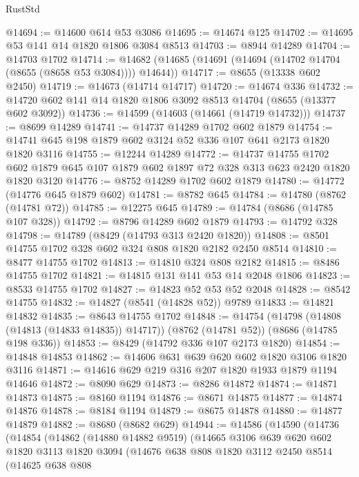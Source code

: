 \begin{lexlean}{RustStd}
\begin{coremodule}
@14694 := @14600 @614 @53 @3086
@14695 := @14674 @125
@14702 := @14695 @53 @141 @14 @1820 @1806 @3084 @8513
@14703 := @8944 @14289
@14704 := @14703 @1702
@14714 := @14682 (@14685 (@14691 (@14694 (@14702 @14704 (@8655 (@8658 @53 @3084)))) @14644))
@14717 := @8655 (@13338 @602 @2450)
@14719 := @14673 (@14714 @14717)
@14720 := @14674 @336
@14732 := @14720 @602 @141 @14 @1820 @1806 @3092 @8513 @14704 (@8655 (@13377 @602 @3092))
@14736 := @14599 (@14603 (@14661 (@14719 @14732)))
@14737 := @8699 @14289
@14741 := @14737 @14289 @1702 @602 @1879
@14754 := @14741 @645 @198 @1879 @602 @3124 @52 @336 @107 @641 @2173 @1820 @1820 @3116
@14755 := @12244 @14289
@14772 := @14737
    @14755
    @1702
    @602
    @1879
    @645
    @107
    @1879
    @602
    @1897
    @72
    @328
    @313
    @623
    @2420
    @1820
    @1820
    @3120
@14776 := @8752 @14289 @1702 @602 @1879
@14780 := @14772 (@14776 @645 @1879 @602)
@14781 := @8782 @645
@14784 := @14780 (@8762 (@14781 @72))
@14785 := @12275 @645
@14789 := @14784 (@8686 (@14785 @107 @328))
@14792 := @8796 @14289 @602 @1879
@14793 := @14792 @328
@14798 := @14789 (@8429 (@14793 @313 @2420 @1820))
@14808 := @8501 @14755 @1702 @328 @602 @324 @808 @1820 @2182 @2450 @8514
@14810 := @8477 @14755 @1702
@14813 := @14810 @324 @808 @2182
@14815 := @8486 @14755 @1702
@14821 := @14815 @131 @141 @53 @14 @2048 @1806
@14823 := @8533 @14755 @1702
@14827 := @14823 @52 @53 @52 @2048
@14828 := @8542 @14755
@14832 := @14827 (@8541 (@14828 @52)) @9789
@14833 := @14821 @14832
@14835 := @8643 @14755 @1702
@14848 := @14754
    (@14798 (@14808 (@14813 (@14833 @14835)) @14717))
    (@8762 (@14781 @52))
    (@8686 (@14785 @198 @336))
@14853 := @8429 (@14792 @336 @107 @2173 @1820)
@14854 := @14848 @14853
@14862 := @14606 @631 @639 @620 @602 @1820 @3106 @1820 @3116
@14871 := @14616 @629 @219 @316 @207 @1820 @1933 @1879 @1194 @14646
@14872 := @8090 @629
@14873 := @8286 @14872
@14874 := @14871 @14873
@14875 := @8160 @1194
@14876 := @8671 @14875
@14877 := @14874 @14876
@14878 := @8184 @1194
@14879 := @8675 @14878
@14880 := @14877 @14879
@14882 := @8680 (@8682 @629)
@14944 := @14586
    (@14590
      (@14736
        (@14854
          (@14862
            (@14880 @14882 @9519)
            (@14665
              @3106
              @639
              @620
              @602
              @1820
              @3113
              @1820
              @3094
              (@14676
                @638
                @808
                @1820
                @3112
                @2450
                @8514
                (@14625
                  @638
                  @808

\end{coremodule}
\end{lexlean}
